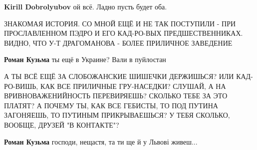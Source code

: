 \begin{itemize}
\begin{itemize}
 
\textbf{Kirill Dobrolyubov} ой всё. \Smiley[1.0][yellow] Ладно пусть будет оба. \Smiley[1.0][yellow]
\end{itemize}

 

ЗНАКОМАЯ ИСТОРИЯ. СО МНОЙ ЕЩЁ И НЕ ТАК ПОСТУПИЛИ - ПРИ ПРОСЛАВЛЕННОМ ПЭДРО И
ЕГО КАД-РО-ВЫХ ПРЕДШЕСТВЕННИКАХ. ВИДНО, ЧТО У-Т ДРАГОМАНОВА - БОЛЕЕ ПРИЛИЧНОЕ
ЗАВЕДЕНИЕ

\begin{itemize}
 
\textbf{Роман Кузьма} ты ещё в Украине? Вали в пуйлостан

 

А ТЫ ВСЁ ЕЩЁ ЗА СЛОБОЖАНСКИЕ ШИШЕЧКИ ДЕРЖИШЬСЯ? ИЛИ КАД-РО-ВИШЬ, КАК ВСЕ
ПРИЛИЧНЫЕ ГРУ-НАСЕДКИ? СЛУШАЙ, А НА ВРИВНОВАЖЕНИЙНОСТЬ ПЕРЕВИРЯЕШЬ? СКОЛЬКО
ТЕБЕ ЗА ЭТО ПЛАТЯТ? А ПОЧЕМУ ТЫ, КАК ВСЕ ГЕБИСТЫ, ТО ПОД ПУТИНА ЗАГОНЯЕШЬ, ТО
ПУТИНЫМ ПРИКРЫВАЕШЬСЯ? У ТЕБЯ СКОЛЬКО, ВООБЩЕ, ДРУЗЕЙ "В КОНТАКТЕ"?


 
\textbf{Роман Кузьма} господи, нещастя, та ти ще й у Львові живеш...

 

\end{itemize}
\end{itemize}
